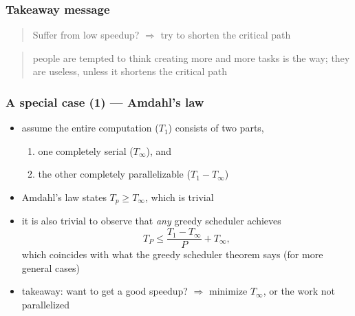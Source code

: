 \documentclass[12pt,dvipdfmx]{beamer}
\newcommand{\ao}[1]{{\color{blue}#1}}
\newcommand{\aka}[1]{{\color{red}#1}}
\begin{document}
\begin{frame}
\frametitle{Takeaway message}

\begin{quote}
{\Large Suffer from low speedup?
$\Rightarrow$
\ao{try to shorten the critical path}}
\end{quote}

{\small
\begin{quote}
people are tempted to think
creating \aka{more and more tasks} is the way; 
they are useless, unless it shortens the 
critical path
\end{quote}}

\begin{center}
\def\svgwidth{0.6\textwidth}
{\scriptsize }
\end{center}
\end{frame}

\begin{frame}
  \frametitle{A special case (1) --- Amdahl's law}
  \begin{itemize}
  \item assume the entire computation ($T_1$)
    consists of two parts,
    \begin{enumerate}
    \item one completely serial
      ($T_\infty$), and
    \item the other completely parallelizable
      ($T_1 - T_\infty$)
    \end{enumerate}
  \begin{center}
    \def\svgwidth{0.7\columnwidth}
    {\scriptsize}
  \end{center}
  \item Amdahl's law states $T_p \geq T_\infty$, which is trivial
  \item it is also trivial to observe that {\it any} greedy scheduler achieves
    \[ T_P \leq \frac{T_1 - T_\infty}{P} + T_\infty, \]
    which coincides with what the greedy scheduler theorem says
    (for more general cases)
  \item takeaway: want to get a good speedup? $\Rightarrow$ minimize $T_\infty$, or the work not parallelized
  \end{itemize}
\end{frame}
\end{document}
